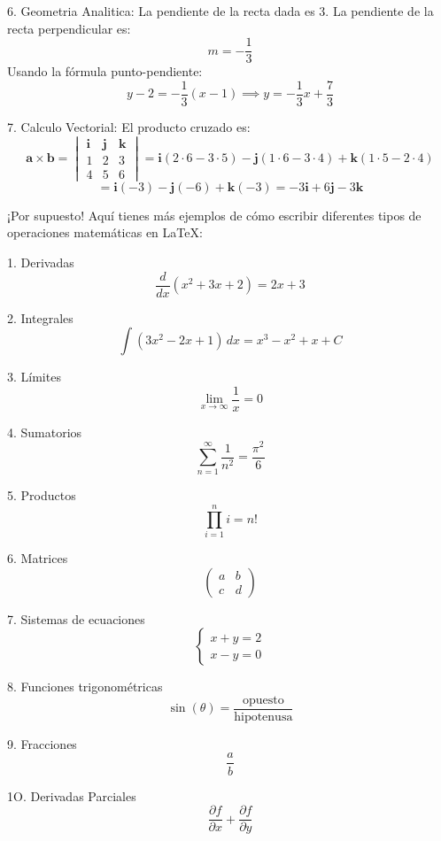 \documentclass[12pt,Letterpaper]{article}
\begin{document}
6. Geometria Analitica:
La pendiente de la recta dada es 3. La pendiente de la recta perpendicular es:
\[m = -\frac{1}{3}\]
Usando la fórmula punto-pendiente:\[y - 2 = -\frac{1}{3}(x - 1) \implies y = -\frac{1}{3}x + \frac{7}{3}\]


7. Calculo Vectorial:
El producto cruzado es:
\[\mathbf{a} \times \mathbf{b} = \begin{vmatrix}\mathbf{i} & \mathbf{j} & \mathbf{k}\\
1 & 2 & 3 \\4 & 5 & 6
\end{vmatrix} = \mathbf{i}(2 \cdot 6 - 3 \cdot 5) - \mathbf{j}(1 \cdot 6 - 3 \cdot 4) + \mathbf{k}(1 \cdot 5 - 2 \cdot 4)\]\[= \mathbf{i}(-3) - \mathbf{j}(-6) + \mathbf{k}(-3) = -3\mathbf{i} + 6\mathbf{j} - 3\mathbf{k}\]


¡Por supuesto! Aquí tienes más ejemplos de cómo escribir diferentes tipos de operaciones matemáticas en LaTeX:


1. Derivadas \[\frac{d}{dx} \left( x^2 + 3x + 2 \right) = 2x + 3\]


2. Integrales \[\int (3x^2 - 2x + 1) \, dx = x^3 - x^2 + x + C\]


3. Límites \[\lim_{x \to \infty} \frac{1}{x} = 0\]


4. Sumatorios \[\sum_{n=1}^{\infty} \frac{1}{n^2} = \frac{\pi^2}{6}\]


5. Productos \[\prod_{i=1}^{n} i = n!\]



6. Matrices \[\begin{pmatrix}a & b \\c & d\end{pmatrix}\]



7. Sistemas de ecuaciones \[\begin{cases}x + y = 2 \\x - y = 0\end{cases}\]



8. Funciones trigonométricas \[\sin(\theta) = \frac{\text{opuesto}}{\text{hipotenusa}}\]



9. Fracciones \[\frac{a}{b}\]



1O. Derivadas Parciales \[\frac{\partial f}{\partial x} + \frac{\partial f}{\partial y}\]
\end{document}
